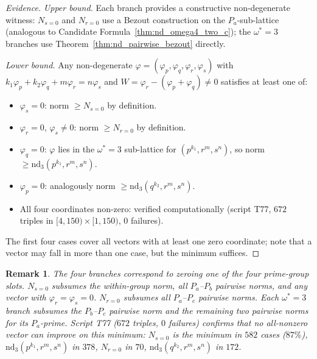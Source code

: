\documentclass[12pt]{article}
\newtheorem{remark}{Remark}
\theoremstyle{definition}
\begin{document}
\begin{proof}[Evidence]
  \textit{Upper bound.}  Each branch provides a constructive non-degenerate
  witness: $N_{s=0}$ and $N_{r=0}$ use a Bezout construction on the
  $P_a$-sub-lattice (analogous to Candidate Formula~\ref{thm:nd_omega4_two_c}); the
  $\omega^*=3$ branches use Theorem~\ref{thm:nd_pairwise_bezout} directly.

  \textit{Lower bound.}
  Any non-degenerate $\varphi = (\varphi_p, \varphi_q, \varphi_r, \varphi_s)$
  with $k_1\varphi_p + k_2\varphi_q + m\varphi_r = n\varphi_s$ and
  $W = \varphi_r - (\varphi_p + \varphi_q) \ne 0$ satisfies at least one of:
  \begin{itemize}
    \item $\varphi_s = 0$: norm $\ge N_{s=0}$ by definition.
    \item $\varphi_r = 0$, $\varphi_s \ne 0$: norm $\ge N_{r=0}$ by definition.
    \item $\varphi_q = 0$: $\varphi$ lies in the $\omega^*=3$ sub-lattice for
      $(p^{k_1},r^m,s^n)$, so norm $\ge \mathrm{nd}_{3}(p^{k_1},r^m,s^n)$.
    \item $\varphi_p = 0$: analogously norm $\ge \mathrm{nd}_{3}(q^{k_2},r^m,s^n)$.
    \item All four coordinates non-zero: verified computationally (script T77,
      $672$ triples in $[4,150)\times[1,150)$, $0$ failures).
  \end{itemize}
  The first four cases cover all vectors with at least one zero coordinate;
  note that a vector may fall in more than one case, but the minimum suffices.
\end{proof}

\begin{remark}
  The four branches correspond to zeroing one of the four prime-group slots.
  $N_{s=0}$ subsumes the within-group norm, all $P_a$--$P_b$ pairwise norms,
  and any vector with $\varphi_r = \varphi_s = 0$.
  $N_{r=0}$ subsumes all $P_a$--$P_c$ pairwise norms.
  Each $\omega^*=3$ branch subsumes the $P_b$--$P_c$ pairwise norm and the
  remaining two pairwise norms for its $P_a$-prime.
  Script T77 ($672$ triples, $0$ failures) confirms that no all-nonzero vector
  can improve on this minimum: $N_{s=0}$ is the minimum in $582$ cases ($87\%$),
  $\mathrm{nd}_{3}(p^{k_1},r^m,s^n)$ in $378$, $N_{r=0}$ in $70$,
  $\mathrm{nd}_{3}(q^{k_2},r^m,s^n)$ in $172$.
\end{remark}
\end{document}
